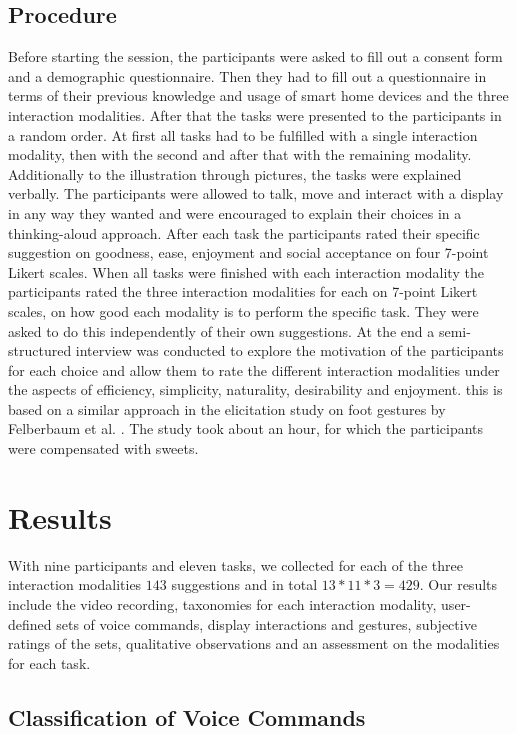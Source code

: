 \documentclass[sigchi]{acmart}
\begin{document}
	\subsection{Procedure}
	Before starting the session, the participants were asked to fill out a consent form and a demographic questionnaire. Then they had to fill out a questionnaire in terms of their previous knowledge and usage of smart home devices and the three interaction modalities. After that the tasks were presented to the participants in a random order. At first all tasks had to be fulfilled with a single interaction modality, then with the second and after that with the remaining modality. Additionally to the illustration through pictures, the tasks were explained verbally. The participants were allowed to talk, move and interact with a display in any way they wanted and were encouraged to explain their choices in a thinking-aloud approach. After each task the participants rated their specific suggestion on goodness, ease, enjoyment and social acceptance on four 7-point Likert scales. When all tasks were finished with each interaction modality the participants rated the three interaction modalities for each on 7-point Likert scales, on how good each modality is to perform the specific task. They were asked to do this independently of their own suggestions. At the end a semi-structured interview was conducted to explore the motivation of the participants for each choice and allow them to rate the different interaction modalities under the aspects of efficiency, simplicity, naturality, desirability and enjoyment. this is based on a similar approach in the elicitation study on foot gestures by Felberbaum et al. \cite{Felberbaum.2018}. The study took about an hour, for which the participants were compensated with sweets.
	
	\section{Results}
	With nine participants and eleven tasks, we collected for each of the three interaction modalities $143$ suggestions and in total $13*11*3=429$. Our results include the video recording, taxonomies for each interaction modality, user-defined sets of voice commands, display interactions and gestures, subjective ratings of the sets, qualitative observations and an assessment on the modalities for each task. 
	
	\subsection{Classification of Voice Commands}
\end{document}
